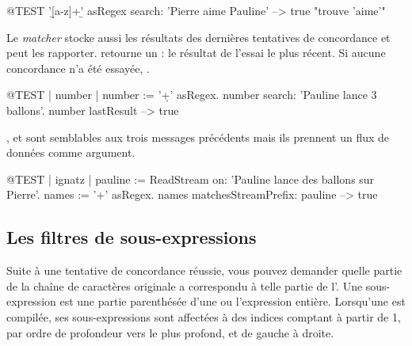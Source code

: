 \documentclass[a4paper,10pt,twoside]{book}
\begin{document}
\begin{code}{@TEST}
'\b[a-z]+\b' asRegex search: 'Pierre aime Pauline' --> true    "trouve 'aime'"
\end{code}

Le \emph{matcher} stocke aussi les résultats des dernières tentatives
de concordance et peut les rapporter.
 retourne un : le résultat
de l'essai le plus récent. Si aucune concordance n'a été essayée, .

\begin{code}{@TEST | number |}
number := '\d+' asRegex.
number search: 'Pauline lance 3 ballons'.
number lastResult --> true
\end{code}

,
 et
 sont semblables aux trois messages
précédents mais ils prennent un flux de données comme argument.

\begin{code}{@TEST | ignatz |}
pauline := ReadStream on: 'Pauline lance des ballons sur Pierre'.
names := '\<[A-Z][a-z]+\>' asRegex.
names matchesStreamPrefix: pauline --> true
\end{code}

\subsection{Les filtres de sous-expressions}

Suite à une tentative de concordance réussie, vous pouvez demander
quelle partie de la chaîne de caractères originale a correspondu à
telle partie de l'\expreg. Une sous-expression est une partie
parenthésée d'une \expreg ou l'expression entière.
Lorsqu'une \expreg est compilée, ses sous-expressions sont affectées à
des indices comptant à partir de 1, par ordre de profondeur
  vers le plus profond, et de gauche à droite. 
\end{document}

